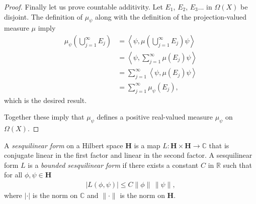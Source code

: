 \begin{proof}
    Finally let us prove countable additivity. Let $E_1$, $E_2$, $E_3$... in $\Omega(X)$ be disjoint. The definition of $\mu_\psi$ along with the definition of the projection-valued measure $\mu$ imply
    \begin{align}
        \mu_\psi \left( \bigcup_{j = 1}^{\infty} E_j \right) &= \left< \psi, \mu \left( \bigcup_{j = 1}^{\infty} E_j \right) \psi \right>  \\
                                                             &= \left< \psi, \sum_{j = 1}^{\infty} \mu(E_j) \psi \right>  \\
                                                             &= \sum_{j = 1}^{\infty} \left< \psi, \mu(E_j) \psi \right>  \\
                                                             &= \sum_{j = 1}^{\infty} \mu_\psi(E_j),
    \end{align}
    which is the desired result.

    Together these imply that $\mu_\psi$ defines a positive real-valued measure $\mu_\psi$ on $\Omega(X)$.
\end{proof}

\begin{definition}
    \label{def:bounded-sesquilinear form}
    A \textit{sesquilinear form} on a Hilbert space $\mathbf{H}$ is a map $L : \mathbf{H} \times \mathbf{H} \rightarrow \mathbb{C}$ that is conjugate linear in the first factor and linear in the second factor. A sesquilinear form  $L$ is a \textit{bounded sesquilinear form} if there exists a constant $C$ in $\mathbb{R}$ such that for all $\phi, \psi \in \mathbf{H}$
    \begin{align}
        |L(\phi, \psi)| \le C \|\phi\| \, \|\psi\|,
    \end{align}
    where $|\cdot|$ is the norm on $\mathbb{C}$ and $\|\cdot\|$ is the norm on $\mathbf{H}$.
\end{definition}

